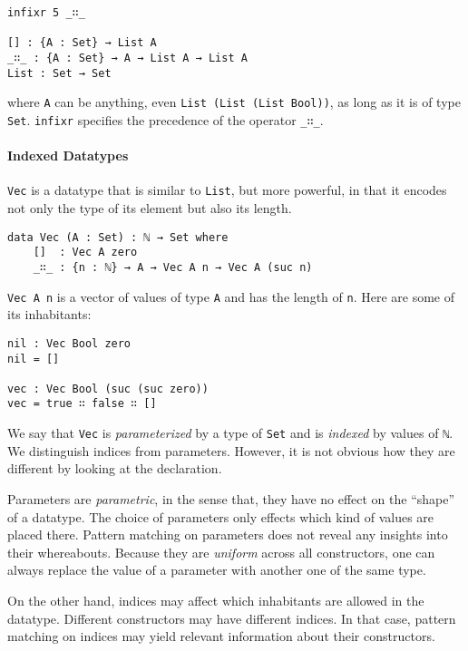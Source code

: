 \documentclass[\main/thesis.tex]{subfiles}
\begin{document}
\begin{lstlisting}
infixr 5 _∷_

[] : {A : Set} → List A
_∷_ : {A : Set} → A → List A → List A
List : Set → Set
\end{lstlisting}
%
where {\lstinline|A|} can be anything, even {\lstinline|List (List (List Bool))|},
as long as it is of type {\lstinline|Set|}. {\lstinline|infixr|} specifies the
precedence of the operator {\lstinline|_∷_|}.

\paragraph{Indexed Datatypes}



{\lstinline|Vec|} is a datatype that is similar to {\lstinline|List|}, but more
powerful, in that it encodes not only the type of its element but also its
length.

\begin{lstlisting}
data Vec (A : Set) : ℕ → Set where
    []  : Vec A zero
    _∷_ : {n : ℕ} → A → Vec A n → Vec A (suc n)
\end{lstlisting}

{\lstinline|Vec A n|} is a vector of values of type {\lstinline|A|} and
has the length of {\lstinline|n|}. Here are some of its inhabitants:

\begin{lstlisting}
nil : Vec Bool zero
nil = []

vec : Vec Bool (suc (suc zero))
vec = true ∷ false ∷ []
\end{lstlisting}

We say that {\lstinline|Vec|} is \textit{parameterized} by a type of {\lstinline|Set|}
and is \textit{indexed} by values of {\lstinline|ℕ|}.
We distinguish indices from parameters. However, it is not obvious how they are
different by looking at the declaration.

Parameters are \textit{parametric}, in the sense that, they have no effect on the ``shape'' of a datatype.
The choice of parameters only effects which kind of values are placed there.
Pattern matching on parameters does not reveal any insights into their whereabouts.
Because they are \textit{uniform} across all constructors, one can always replace
the value of a parameter with another one of the same type.

On the other hand, indices may affect which inhabitants are allowed in the
datatype. Different constructors may have different indices. In that case, pattern
matching on indices may yield relevant information about their constructors.
\end{document}

